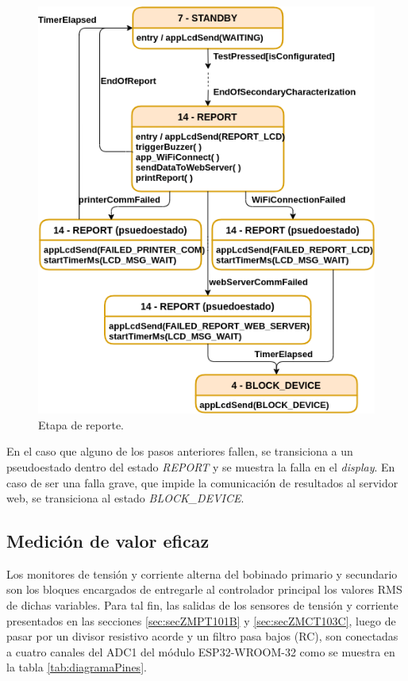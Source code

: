 \pagebreak

\begin{figure}[ht]
	\centering
	\includegraphics[scale=1]{./Figures/MainFSM_4.png}
	\caption{Etapa de reporte.}
	\label{fig:MainFSM_4}
\end{figure}

En el caso que alguno de los pasos anteriores fallen, se transiciona a un pseudoestado dentro del estado \textit{REPORT} y se muestra la falla en el \textit{display}. En caso de ser una falla grave, que impide la comunicación de resultados al servidor web, se transiciona al estado \textit{BLOCK\_DEVICE}.

\subsection{Medición de valor eficaz}
\label{subsec:RMS}

Los monitores de tensión y corriente alterna del bobinado primario y secundario son los bloques encargados de entregarle al controlador principal los valores RMS de dichas variables. Para tal fin, las salidas de los sensores de tensión y corriente presentados en las secciones \ref{sec:secZMPT101B} y \ref{sec:secZMCT103C}, luego de pasar por un divisor resistivo acorde y un filtro pasa bajos (RC), son conectadas a cuatro canales del ADC1 del módulo ESP32-WROOM-32 como se muestra en la tabla \ref{tab:diagramaPines}.

